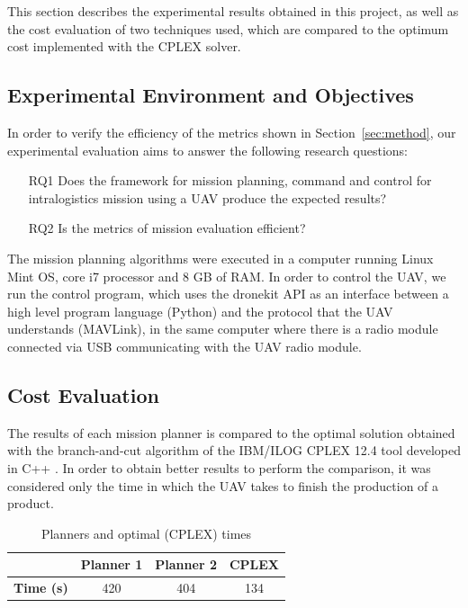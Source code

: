 \documentclass[conference]{IEEEtran}
\begin{document}
This section describes the experimental results obtained in this project, as well as the cost evaluation of two techniques used, which are compared to the optimum cost implemented with the CPLEX solver.

\subsection{Experimental Environment and Objectives}
\label{ssec:expobjandenv}
In order to verify the efficiency of the metrics shown in Section~\ref{sec:method}, our experimental evaluation aims to answer the following research questions:
\begin{enumerate}

\item[RQ1] Does the framework for mission planning, command and control for intralogistics mission using a UAV produce the expected results?

\item[RQ2] Is the metrics of mission evaluation efficient?

\end{enumerate}

The mission planning algorithms were executed in a computer running Linux Mint OS, core i7 processor and 8 GB of RAM. In order to control the UAV, we run the control program, which uses the dronekit API as an interface between a high level program language (Python) and the protocol that the UAV understands (MAVLink), in the same computer where there is a radio module connected via USB communicating with the UAV radio module.


\subsection{Cost Evaluation}
\label{ssec:acusto}

The results of each mission planner is compared to the optimal solution obtained with the branch-and-cut algorithm of the IBM/ILOG CPLEX 12.4 tool developed in C++ \cite{cplex2003ilog}. In order to obtain better results to perform the comparison, it was considered only the time in which the UAV takes to finish the production of a product.

\begin{table}[H]
\centering
\footnotesize

\begin{tabular}{c|c|c|c|}
\cline{2-4}
                                        & \textbf{Planner 1} & \textbf{Planner 2} & \textbf{CPLEX} \\ \hline
\multicolumn{1}{|c|}{\textbf{Time (s)}} & 420                & 404                & 134            \\ \hline
\end{tabular}
\caption{Planners and optimal (CPLEX) times}
\label{fig:comp}
\end{table}
\end{document}
